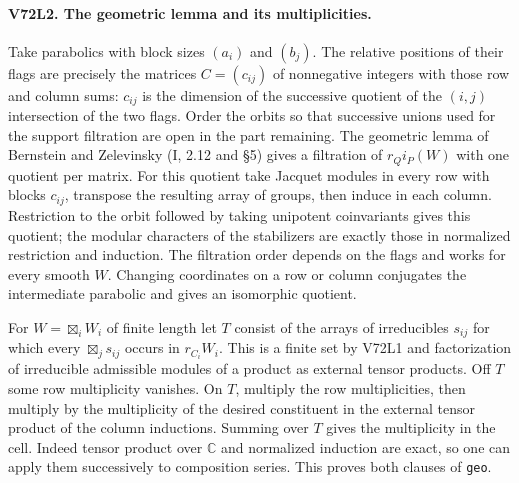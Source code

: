 \paragraph{V72L2. The geometric lemma and its multiplicities.}
Take parabolics with block sizes $(a_i)$ and $(b_j)$. The relative
positions of their flags are precisely the matrices $C=(c_{ij})$ of
nonnegative integers with those row and column sums: $c_{ij}$ is the
dimension of the successive quotient of the $(i,j)$ intersection
of the two flags. Order the orbits so that successive unions used
for the support filtration are open in the part remaining. The
geometric lemma of Bernstein and Zelevinsky (I, 2.12 and \S5)
gives a filtration of $r_Qi_P(W)$ with one quotient per matrix.
For this quotient take Jacquet modules in every row with blocks
$c_{ij}$, transpose the resulting array of groups, then induce in
each column. Restriction to the orbit followed by taking unipotent
coinvariants gives this quotient; the modular characters of the
stabilizers are exactly those in normalized restriction and
induction. The filtration order depends on the flags and works for
every smooth $W$. Changing coordinates on a row or column conjugates
the intermediate parabolic and gives an isomorphic quotient.

For $W=\boxtimes_i W_i$ of finite length let $T$ consist of the
arrays of irreducibles $s_{ij}$ for which every
$\boxtimes_j s_{ij}$ occurs in $r_{C_i}W_i$. This is a finite set
by V72L1 and factorization of irreducible admissible modules of
a product as external tensor products. Off $T$ some row multiplicity
vanishes. On $T$, multiply the row multiplicities, then multiply by
the multiplicity of the desired constituent in the external tensor
product of the column inductions. Summing over $T$ gives the
multiplicity in the cell. Indeed tensor product over $\mathbb C$
and normalized induction are exact, so one can apply them successively
to composition series. This proves both clauses of \texttt{geo}.

